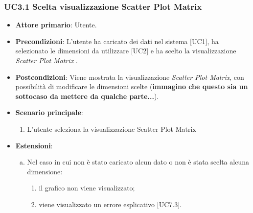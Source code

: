 \subsubsection{UC3.1 Scelta visualizzazione Scatter Plot Matrix}
\begin{figure}[h]
\centering
\caption{}
\end{figure}
\begin{itemize}
	\item \textbf{Attore primario}: Utente.
	\item \textbf{Precondizioni}: L'utente ha caricato dei dati nel sistema [UC1], ha selezionato le dimensioni da utilizzare [UC2] e ha scelto la visualizzazione \textit{Scatter Plot Matrix} .
	\item \textbf{Postcondizioni}: Viene mostrata la visualizzazione \textit{Scatter Plot Matrix}, con possibilità di modificare le dimensioni scelte (\textbf{immagino che questo sia un sottocaso da mettere da qualche parte...}).
	\item \textbf{Scenario principale}:
		\begin{enumerate}
			\item L'utente seleziona la visualizzazione Scatter Plot Matrix
		\end{enumerate}
	\item \textbf{Estensioni}:
	\begin{enumerate}[(a)]
		\item Nel caso in cui non è stato caricato alcun dato o non è stata scelta alcuna dimensione:
		\begin{enumerate}[1.]
			\item il grafico non viene visualizzato;
			\item viene visualizzato un errore esplicativo [UC7.3].
		\end{enumerate}
	\end{enumerate}
\end{itemize}
